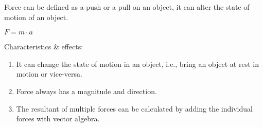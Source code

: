 \documentclass[12pt]{ipu-mechanics}
\begin{document}

    Force can be defined as a push or a pull on an object, it can alter the state of motion of an object.
    \begin{center}
        $F = m\cdot{a}$
    \end{center}

    Characteristics \& effects:
    \begin{enumerate}
        \item It can change the state of motion in an object, i.e., bring an object at rest in motion or vice-versa.
        \item Force always has a magnitude and direction.
        \item The resultant of multiple forces can be calculated by adding the individual forces with vector algebra.
    \end{enumerate}
\end{document}
